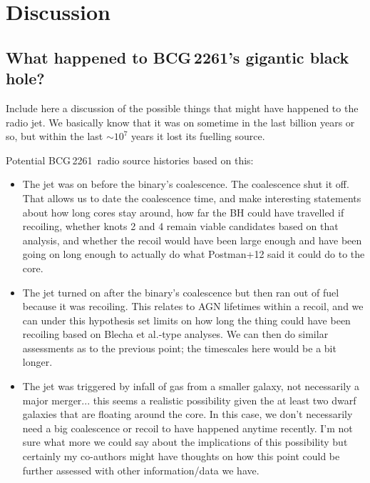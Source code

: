 \documentclass[useAMS,usenatbib]{emulateapj}
\newcommand{\src}{BCG\,2261}
\begin{document}


\section{Discussion}

\subsection{What happened to \src's gigantic black hole?}
Include here a discussion of the possible things that might have happened to the radio jet. We basically know that it was on sometime in the last billion years or so, but within the last $\sim$$10^7$ years it lost its fuelling source. 

Potential \src\ radio source histories based on this:
\begin{itemize}
\item The jet was on before the binary's coalescence. The coalescence shut it off. That allows us to date the coalescence time, and make interesting statements about how long cores stay around, how far the BH could have travelled if recoiling, whether knots 2 and 4 remain viable candidates based on that analysis, and whether the recoil would have been large enough and have been going on long enough to actually do what Postman+12 said it could do to the core.
\item The jet turned on after the binary's coalescence but then ran out of fuel because it was recoiling. This relates to AGN lifetimes within a recoil, and we can under this hypothesis set limits on how long the thing could have been recoiling based on Blecha et al.-type analyses. We can then do similar assessments as to the previous point; the timescales here would be a bit longer.
\item The jet was triggered by infall of gas from a smaller galaxy, not necessarily a major merger... this seems a realistic possibility given the at least two dwarf galaxies that are floating around the core. In this case, we don't necessarily need a big coalescence or recoil to have happened anytime recently. I'm not sure what more we could say about the implications of this possibility but certainly my co-authors might have thoughts on how this point could be further assessed with other information/data we have.
\end{itemize}
\end{document}
